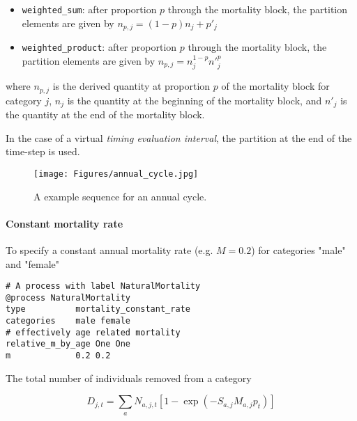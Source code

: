 \begin{itemize}
	\item \texttt{weighted\_sum}: after proportion $p$ through the mortality block, the partition elements are given by $n_{p,j} = (1 - p)n_j + p'_j$

	\item \texttt{weighted\_product}: after proportion $p$ through the mortality block, the partition elements are given by $n_{p,j} = n_j^{1-p} n'^p_j$
\end{itemize}

where $n_{p,j}$ is the derived quantity at proportion $p$ of the mortality block for category $j$, $n_j$ is the quantity at the beginning of the mortality block, and $n'_j$ is the quantity at the end of the mortality block.

In the case of a virtual \textit{timing evaluation interval}, the partition at the end of the time-step is used.


\begin{figure}[H]
	\centering
	\texttt{[image: Figures/annual\_cycle.jpg]}
	\caption{A example sequence for an annual cycle.}\label{Fig:annual2}
\end{figure}



\paragraph{Constant mortality rate}\label{sec:Process-MortalityConstantRate} 

To specify a constant annual mortality rate (e.g. $M=0.2$) for categories "male" and "female"

{\small{\begin{verbatim}
# A process with label NaturalMortality
@process NaturalMortality
type          mortality_constant_rate
categories    male female
# effectively age related mortality
relative_m_by_age One One
m             0.2 0.2
\end{verbatim}}}

The total number of individuals removed from a category

\begin{equation}
D_{j,t} = \sum_a N_{a,j,t} [1 - \exp(-S_{a,j} M_{a,j} p_t)]
\end{equation}


